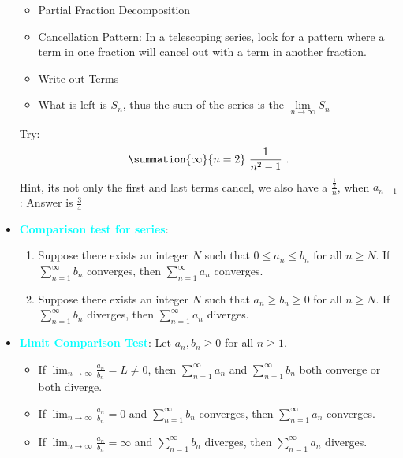 \documentclass{report}
\begin{document}
\begin{itemize}
        \begin{itemize}
            \item Partial Fraction Decomposition
            \item Cancellation Pattern: In a telescoping series, look for a pattern where a term in one fraction will cancel out with a term in another fraction.
            \item Write out Terms
            \item What is left is $S_{n}$, thus the sum of the series is the $\lim\limits_{n \to \infty}{S_{n}} $
        \end{itemize}
        Try: 
        \begin{align*}
            \summation{\infty}{n=2}\ \frac{1}{n^{2}-1}\ 
        .\end{align*}
        Hint, its not only the first and last terms cancel, we also have a $\frac{\frac{1}{2}}{n}$, when $a_{n-1}$: Answer is $\frac{3}{4}$
        \pagebreak 
    \item \textbf{\textcolor{cyan}{Comparison test for series}}:
        \begin{enumerate}
            \item Suppose there exists an integer \( N \) such that \( 0 \leq a_n \leq b_n \) for all \( n \geq N \). If \( \sum_{n=1}^{\infty} b_n \) converges, then \( \sum_{n=1}^{\infty} a_n \) converges. 
            \item  Suppose there exists an integer \( N \) such that \( a_n \geq b_n \geq 0 \) for all \( n \geq N \). If \( \sum_{n=1}^{\infty} b_n \) diverges, then \( \sum_{n=1}^{\infty} a_n \) diverges.
        \end{enumerate}
    \item \textbf{\textcolor{cyan}{Limit Comparison Test}}:
        Let \( a_n, b_n \geq 0 \) for all \( n \geq 1 \).
        \begin{itemize}
            \item If \( \lim_{n \to \infty} \frac{a_n}{b_n} = L \neq 0 \), then \( \sum_{n=1}^{\infty} a_n \) and \( \sum_{n=1}^{\infty} b_n \) both converge or both diverge.
            \item If \( \lim_{n \to \infty} \frac{a_n}{b_n} = 0 \) and \( \sum_{n=1}^{\infty} b_n \) converges, then \( \sum_{n=1}^{\infty} a_n \) converges.
            \item If \( \lim_{n \to \infty} \frac{a_n}{b_n} = \infty \) and \( \sum_{n=1}^{\infty} b_n \) diverges, then \( \sum_{n=1}^{\infty} a_n \) diverges.
        \end{itemize}

\end{itemize}
\end{document}

